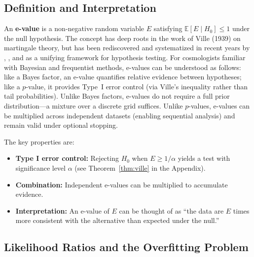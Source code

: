 \documentclass[11pt,a4paper]{article}
\newcommand{\E}{\mathbb{E}}
\begin{document}
\subsection{Definition and Interpretation}

An \textbf{e-value} is a non-negative random variable $E$ satisfying $\E[E \mid H_0] \leq 1$ under the null hypothesis. The concept has deep roots in the work of Ville (1939) on martingale theory, but has been rediscovered and systematized in recent years by \citet{Vovk2021}, \citet{Shafer2021}, and \citet{Ramdas2023} as a unifying framework for hypothesis testing. For cosmologists familiar with Bayesian and frequentist methods, e-values can be understood as follows: like a Bayes factor, an e-value quantifies relative evidence between hypotheses; like a $p$-value, it provides Type~I error control (via Ville's inequality rather than tail probabilities). Unlike Bayes factors, e-values do not require a full prior distribution---a mixture over a discrete grid suffices. Unlike $p$-values, e-values can be multiplied across independent datasets (enabling sequential analysis) and remain valid under optional stopping.

The key properties are:
\begin{itemize}
    \item \textbf{Type I error control:} Rejecting $H_0$ when $E \geq 1/\alpha$ yields a test with significance level $\alpha$ (see Theorem~\ref{thm:ville} in the Appendix).

    \item \textbf{Combination:} Independent e-values can be multiplied to accumulate evidence.

    \item \textbf{Interpretation:} An e-value of $E$ can be thought of as ``the data are $E$ times more consistent with the alternative than expected under the null.''
\end{itemize}

\subsection{Likelihood Ratios and the Overfitting Problem}
\end{document}
